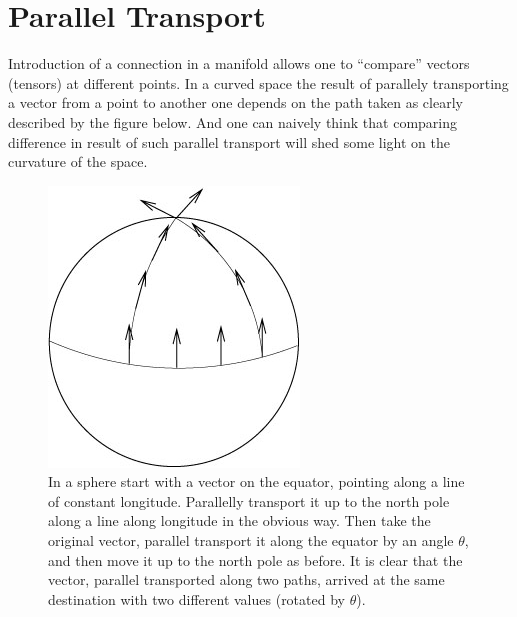 \documentclass[a4paper]{report}
\theoremstyle{definition}
\theoremstyle{remark}
\begin{document}
	\section{Parallel Transport}
		Introduction of a connection in a manifold allows one to \enquote{compare} vectors (tensors) at different points. In a curved space the result of parallely transporting a vector from a point to another one depends on the path taken as clearly described by the figure below. And one can naively think that comparing difference in result of such parallel transport will shed some light on the curvature of the space.
		\begin{figure}[H]
			\centering
			\includegraphics[scale=0.5]{image/sc}
			\caption{In a sphere start with a vector on the equator, pointing along a line of constant longitude. Parallelly transport it up to the north pole along a line along longitude in the obvious way. Then take the original vector, parallel transport it along the equator by an angle $ \theta$, and then move it up to the north pole as before. It is clear that the vector, parallel transported along two paths, arrived at the same destination with two different values (rotated by $ \theta$).}
		\end{figure}
\end{document}
